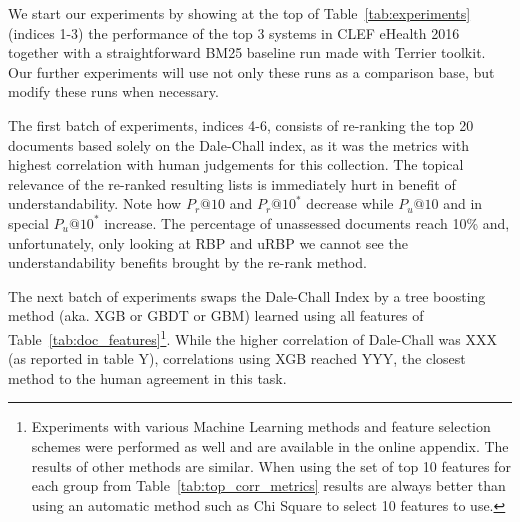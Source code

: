 

We start our experiments by showing at the top of Table~\ref{tab:experiments} (indices 1-3) the performance of the top 3 systems in CLEF eHealth 2016 together with a straightforward BM25 baseline run made with Terrier toolkit. Our further experiments will use not only these runs as a comparison base, but modify these runs when necessary.

The first batch of experiments, indices 4-6, consists of re-ranking the top 20 documents based solely on the Dale-Chall index, as it was the metrics with highest correlation with human judgements for this collection.
The topical relevance of the re-ranked resulting lists is immediately hurt in benefit of understandability. Note how $P_r@10$ and $P_r@10^*$ decrease while $P_u@10$ and in special $P_u@10^*$ increase.
The percentage of unassessed documents reach 10\% and, unfortunately, only looking at RBP and uRBP we cannot see the understandability benefits brought by the re-rank method.

The next batch of experiments swaps the Dale-Chall Index by a tree boosting method (aka. XGB or GBDT or GBM) learned using all features of Table~\ref{tab:doc_features}\footnote{Experiments with various Machine Learning methods and feature selection schemes were performed as well and are available in the online appendix. The results of other methods are similar. When using the set of top 10 features for each group from Table~\ref{tab:top_corr_metrics} results are always better than using an automatic method such as Chi Square to select 10 features to use.}.
While the higher correlation of Dale-Chall was XXX (as reported in table Y), correlations using XGB reached YYY, the closest method to the human agreement in this task.

